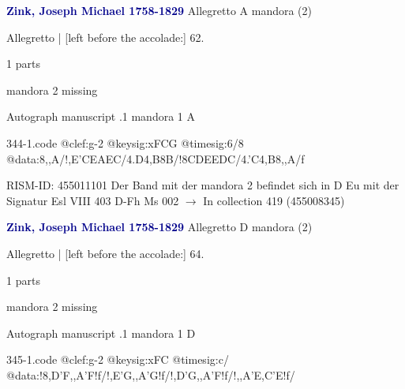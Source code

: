 \documentclass[twocolumn]{book}
\begin{document}
\newline \par \vspace{7pt} \textcolor{darkblue}{\textbf{Zink, Joseph Michael  1758-1829}}
\newline Allegretto  A  
\newline mandora (2)
\newline \begin{itshape}[f.32v, at left:] Allegretto | [left before the accolade:] 62.\end{itshape} 
\newline \textcolor{darkblue}{}  1 parts  
\newline \begin{small} mandora 2 missing\end{small} 
\newline Autograph manuscript
.1  mandora 1  A  
\begin{filecontents*}{344-1.code}
@clef:g-2
@keysig:xFCG
@timesig:6/8
@data:8,,A/!,E'CEAEC/4.D4,B8B/!8CDEEDC/4.'C4,B8,,A/f
\end{filecontents*}
\newline
%

\newline RISM-ID: 455011101
\newline Der Band mit der mandora 2 befindet sich in D Eu mit der Signatur Esl VIII 403
\newline D-Fh  Ms 002
\newline $\rightarrow$ In collection 419 (455008345)

\newline \par \vspace{7pt} \textcolor{darkblue}{\textbf{Zink, Joseph Michael  1758-1829}}
\newline Allegretto  D  
\newline mandora (2)
\newline \begin{itshape}[f.33v, at left:] Allegretto | [left before the accolade:] 64.\end{itshape} 
\newline \textcolor{darkblue}{}  1 parts  
\newline \begin{small} mandora 2 missing\end{small} 
\newline Autograph manuscript
.1  mandora 1  D  
\begin{filecontents*}{345-1.code}
@clef:g-2
@keysig:xFC
@timesig:c/
@data:!{8,D'F,,A'F}!f/!{,E'G,,A'G}!f/!{,D'G,,A'F}!f/!{,,A'E,C'E}!f/
\end{filecontents*}
\newline
%
\end{document}

